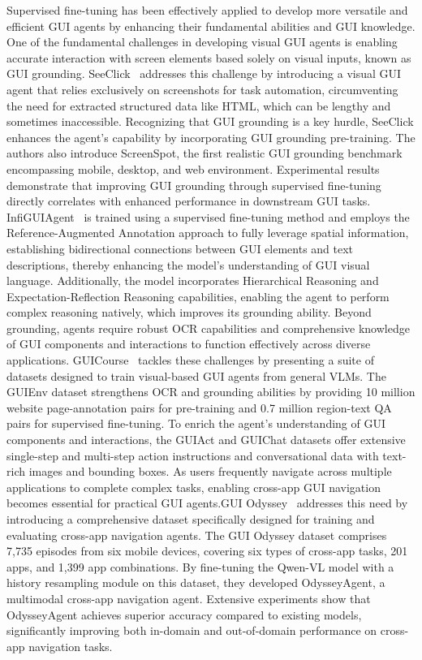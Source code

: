 Supervised fine-tuning has been effectively applied to develop more versatile and efficient GUI agents by enhancing their fundamental abilities and GUI knowledge.
One of the fundamental challenges in developing visual GUI agents is enabling accurate interaction with screen elements based solely on visual inputs, known as GUI grounding. SeeClick~\cite{cheng2024seeclick} addresses this challenge by introducing a visual GUI agent that relies exclusively on screenshots for task automation, circumventing the need for extracted structured data like HTML, which can be lengthy and sometimes inaccessible. Recognizing that GUI grounding is a key hurdle, SeeClick enhances the agent's capability by incorporating GUI grounding pre-training. The authors also introduce ScreenSpot, the first realistic GUI grounding benchmark encompassing mobile, desktop, and web environment. Experimental results demonstrate that improving GUI grounding through supervised fine-tuning directly correlates with enhanced performance in downstream GUI tasks.
InfiGUIAgent~\cite{liu2025infiguiagent} is trained using a supervised fine-tuning method and employs the Reference-Augmented Annotation approach to fully leverage spatial information, establishing bidirectional connections between GUI elements and text descriptions, thereby enhancing the model's understanding of GUI visual language. Additionally, the model incorporates Hierarchical Reasoning and Expectation-Reflection Reasoning capabilities, enabling the agent to perform complex reasoning natively, which improves its grounding ability.
Beyond grounding, agents require robust OCR capabilities and comprehensive knowledge of GUI components and interactions to function effectively across diverse applications. GUICourse~\cite{chen2024guicourse} tackles these challenges by presenting a suite of datasets designed to train visual-based GUI agents from general VLMs. The GUIEnv dataset strengthens OCR and grounding abilities by providing 10 million website page-annotation pairs for pre-training and 0.7 million region-text QA pairs for supervised fine-tuning. To enrich the agent's understanding of GUI components and interactions, the GUIAct and GUIChat datasets offer extensive single-step and multi-step action instructions and conversational data with text-rich images and bounding boxes.
As users frequently navigate across multiple applications to complete complex tasks, enabling cross-app GUI navigation becomes essential for practical GUI agents.GUI Odyssey~\cite{lu2024guiodyssey} addresses this need by introducing a comprehensive dataset specifically designed for training and evaluating cross-app navigation agents. The GUI Odyssey dataset comprises 7,735 episodes from six mobile devices, covering six types of cross-app tasks, 201 apps, and 1,399 app combinations. By fine-tuning the Qwen-VL model with a history resampling module on this dataset, they developed OdysseyAgent, a multimodal cross-app navigation agent. Extensive experiments show that OdysseyAgent achieves superior accuracy compared to existing models, significantly improving both in-domain and out-of-domain performance on cross-app navigation tasks.
